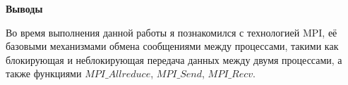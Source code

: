 \textbf{\large Выводы}

Во время выполнения данной работы я познакомился с технологией MPI, её базовыми механизмами обмена сообщениями между процессами, такими как блокирующая и неблокирующая передача данных между двумя процессами, а также функциями $MPI\_Allreduce$, $MPI\_Send$, $MPI\_Recv$.